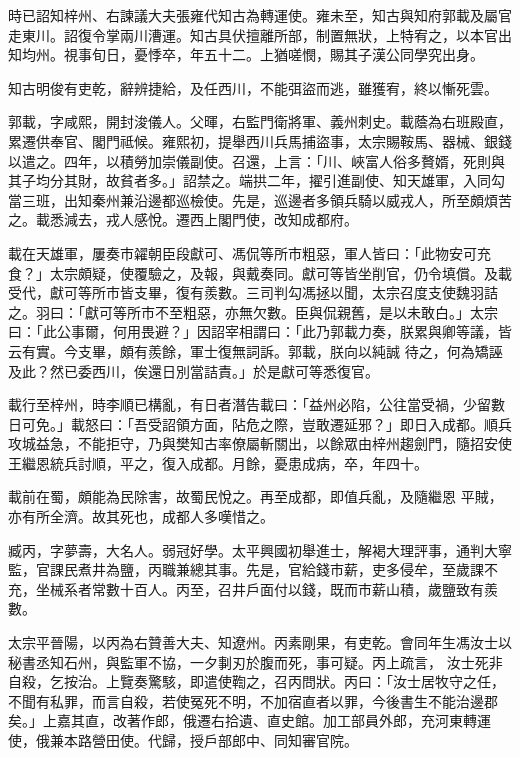 \begin{pinyinscope}
 時已詔知梓州、右諫議大夫張雍代知古為轉運使。雍未至，知古與知府郭載及屬官走東川。詔復令掌兩川漕運。知古具伏擅離所部，制置無狀，上特宥之，以本官出知均州。視事旬日，憂悸卒，年五十二。上猶嗟憫，賜其子漢公同學究出身。



 知古明俊有吏乾，辭辨捷給，及任西川，不能弭盜而逃，雖獲宥，終以慚死雲。



 郭載，字咸熙，開封浚儀人。父暉，右監門衛將軍、義州刺史。載蔭為右班殿直，累遷供奉官、閣門祗候。雍熙初，提舉西川兵馬捕盜事，太宗賜鞍馬、器械、銀錢以遣之。四年，以積勞加崇儀副使。召還，上言：「川、峽富人俗多贅婿，死則與其子均分其財，故貧者多。」詔禁之。端拱二年，擢引進副使、知天雄軍，入同勾當三班，出知秦州兼沿邊都巡檢使。先是，巡邊者多領兵騎以威戎人，所至頗煩苦之。載悉減去，戎人感悅。遷西上閣門使，改知成都府。



 載在天雄軍，屢奏市糴朝臣段獻可、馮侃等所市粗惡，軍人皆曰：「此物安可充食？」太宗頗疑，使覆驗之，及報，與戴奏同。獻可等皆坐削官，仍令填償。及載受代，獻可等所市皆支畢，復有羨數。三司判勾馮拯以聞，太宗召度支使魏羽詰之。羽曰：「獻可等所市不至粗惡，亦無欠數。臣與侃親舊，是以未敢白。」太宗曰：「此公事爾，何用畏避？」因詔宰相謂曰：「此乃郭載力奏，朕累與卿等議，皆云有實。今支畢，頗有羨餘，軍士復無詞訴。郭載，朕向以純誠
 待之，何為矯誣及此？然已委西川，俟還日別當詰責。」於是獻可等悉復官。



 載行至梓州，時李順已構亂，有日者潛告載曰：「益州必陷，公往當受禍，少留數日可免。」載怒曰：「吾受詔領方面，阽危之際，豈敢遷延邪？」即日入成都。順兵攻城益急，不能拒守，乃與樊知古率僚屬斬關出，以餘眾由梓州趨劍門，隨招安使王繼恩統兵討順，平之，復入成都。月餘，憂患成病，卒，年四十。



 載前在蜀，頗能為民除害，故蜀民悅之。再至成都，即值兵亂，及隨繼恩
 平賊，亦有所全濟。故其死也，成都人多嘆惜之。



 臧丙，字夢壽，大名人。弱冠好學。太平興國初舉進士，解褐大理評事，通判大寧監，官課民煮井為鹽，丙職兼總其事。先是，官給錢市薪，吏多侵牟，至歲課不充，坐械系者常數十百人。丙至，召井戶面付以錢，既而市薪山積，歲鹽致有羨數。



 太宗平晉陽，以丙為右贊善大夫、知遼州。丙素剛果，有吏乾。會同年生馮汝士以秘書丞知石州，與監軍不協，一夕剚刃於腹而死，事可疑。丙上疏言，
 汝士死非自殺，乞按治。上覽奏驚駭，即遣使鞫之，召丙問狀。丙曰：「汝士居牧守之任，不聞有私罪，而言自殺，若使冤死不明，不加宿直者以罪，今後書生不能治邊郡矣。」上嘉其直，改著作郎，俄遷右拾遺、直史館。加工部員外郎，充河東轉運使，俄兼本路營田使。代歸，授戶部郎中、同知審官院。




\end{pinyinscope}
